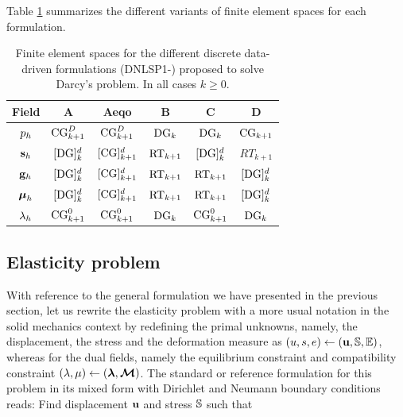 Table \ref{tab:spaces} summarizes the different variants of finite element spaces for each 
formulation.
\begin{table}[h!]
	\centering
	\caption{Finite element spaces for the different discrete data-driven
	formulations (DNLSP1-) proposed to solve Darcy's problem.
	In all cases $k \ge 0$.}
	\label{tab:spaces}
	\vspace{0.25cm}
	\begin{tabular}{cccccc}
		\hline
		\textbf{Field} & \textbf{A}         & \textbf{Aeqo}         & \textbf{B}          & \textbf{C}            & \textbf{D} \\
		\hline
		$p_h$   & $\text{CG}_{k+1}^D$   & $\text{CG}_{k+1}^{D}$  & $\text{DG}_k$           & $\text{DG}_k$            & $\text{CG}_{k+1}$ \\
		$\mathbf{s}_h$   & $[\text{DG}]^d_k$           & $[\text{CG}]^d_{k+1}$       & $\text{RT}_{k+1}$   & $[\text{DG}]^d_k$         & $RT_{k+1}$ \\
		$\mathbf{g}_h$   & $[\text{DG}]^d_k$           & $[\text{CG}]^d_{k+1}$       & $\text{RT}_{k+1}$   & $\text{RT}_{k+1}$   & $[\text{DG}]^d_{k}$ \\
		$\boldsymbol{\mu}_h$  & $[\text{DG}]^d_k$           & $[\text{CG}]^d_{k+1}$       &  $\text{RT}_{k+1}$  & $\text{RT}_{k+1}$   & $[\text{DG}]^d_{k}$  \\
		$\lambda_h$    & $\text{CG}_{k+1}^0$    & $\text{CG}_{k+1}^{0}$   &  $\text{DG}_k$          & $\text{CG}_{k+1}^0$  & $\text{DG}_k$ \\
		\hline
	\end{tabular}
\end{table}

\subsection{Elasticity problem}

With reference to the general formulation we have presented in the
previous section, let us rewrite the elasticity problem with a more usual
notation in the solid mechanics context by redefining the primal
unknowns, namely, the displacement, the stress and the deformation measure
as $(u, s, e) \leftarrow (\mathbf{u}, \mathbb{S}, \mathbb{E})$, whereas for the dual fields, namely
the equilibrium constraint and compatibility constraint $(\lambda, \mu) \leftarrow (\boldsymbol{\lambda}, \boldsymbol{\mathcal{M}})$.
The standard or reference formulation for this
problem in its mixed form with Dirichlet and Neumann
boundary conditions reads: Find displacement $\mathbf{u}$ and 
stress $\mathbb{S}$ such that

